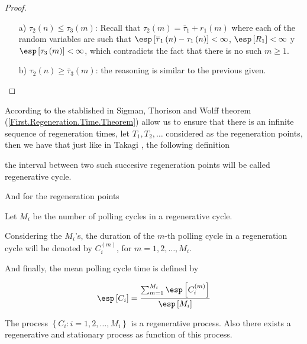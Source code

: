 \begin{proof}
\begin{itemize}
\item[a)] $\tau_{2}\left(n\right)\leq\tau_{3}\left(m\right)$: Recall that $\tau_{2}\left(m\right)=\overline{\tau}_{1}+r_{1}\left(m\right)$ 
where each of the random variables are such that $\esp\left[\overline{\tau}_{1}\left(n\right)-\tau_{1}\left(n\right)\right]<\infty$, $\esp\left[R_{1}\right]<\infty$ y $\esp\left[\tau_{3}\left(m\right)\right]<\infty$, which contradicts the fact that there is no such $m\geq1$.

\item[b)] $\tau_{2}\left(n\right)\geq\overline{\tau}_{3}\left(m\right)$: the reasoning is similar to the previous given.

\end{itemize}

\end{proof}


According to the stablished in Sigman, Thorison and Wolff \cite{Sigman2} theorem (\ref{First.Regeneration.Time.Theorem}) allow us to ensure that there is an infinite sequence of regeneration times, let $T_{1},T_{2},\ldots$ considered as the regeneration points, then we have that just like in Takagi \cite{Takagi}, the following definition

\begin{Def}
the interval between two such succesive regeneration points will be called regenerative cycle.
\end{Def}

And for the regeneration points 

\begin{Def}
Let $M_{i}$ be the number of polling cycles in a regenerative cycle.
\end{Def}

\begin{Def}
Considering the $M_{i}$'s, the duration of the $m$-th polling cycle in a regeneration cycle will be denoted by $C_{i}^{(m)}$, for $m=1,2,\ldots,M_{i}$.
\end{Def}

And finally, the mean polling cycle time is defined by

\begin{Def}
\begin{equation}
\esp\left[C_{i}\right]=\frac{\sum_{m=1}^{M_{i}}\esp\left[C_{i}^{(m)}\right]}{\esp\left[M_{i}\right]}
\end{equation}
\end{Def}

\begin{Teo}
The process $\left\{C_{i}:i=1,2,\ldots,M_{i}\right\}$ is a regenerative process. Also there exists a regenerative and stationary process as function of this process.
\end{Teo}

